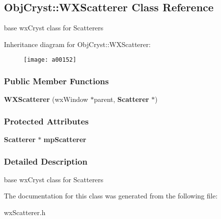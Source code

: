 \subsection{Obj\-Cryst\-:\-:W\-X\-Scatterer Class Reference}
\label{a00152}


base wx\-Cryst class for Scatterers  


Inheritance diagram for Obj\-Cryst\-:\-:W\-X\-Scatterer\-:\begin{figure}[H]
\begin{center}
\leavevmode
\texttt{[image: a00152]}
\end{center}
\end{figure}
\subsubsection*{Public Member Functions}
\begin{DoxyCompactItemize}
\item 
{\bfseries W\-X\-Scatterer} (wx\-Window $\ast$parent, {\bf Scatterer} $\ast$)\label{a00152_a43a37c79f9dca837a55fe024a06fddd6}

\end{DoxyCompactItemize}
\subsubsection*{Protected Attributes}
\begin{DoxyCompactItemize}
\item 
{\bf Scatterer} $\ast$ {\bfseries mp\-Scatterer}\label{a00152_a60b8f362b1735a8942e2991994d5c862}

\end{DoxyCompactItemize}


\subsubsection{Detailed Description}
base wx\-Cryst class for Scatterers 

The documentation for this class was generated from the following file\-:\begin{DoxyCompactItemize}
\item 
wx\-Scatterer.\-h\end{DoxyCompactItemize}
